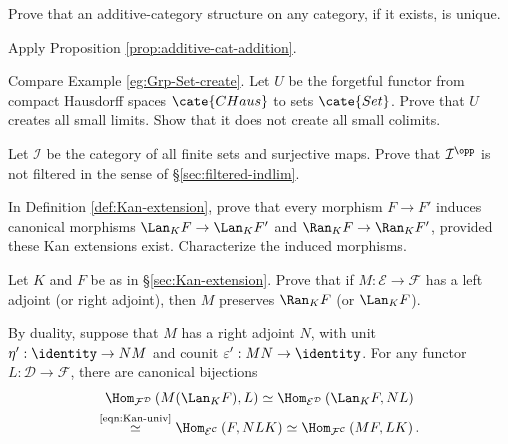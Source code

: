 \begin{Exercises}
	\item Prove that an additive-category structure on any category, if it
	exists, is unique.
	\begin{hint}
		Apply Proposition \ref{prop:additive-cat-addition}.
	\end{hint}

	\item Compare Example \ref{eg:Grp-Set-create}. Let $U$ be the forgetful
	functor from compact Hausdorff spaces $\cate{CHaus}$ to sets $\cate{Set}$.
	Prove that $U$ creates all small limits. Show that it does not create all
	small colimits.

	\item Let $\mathcal{I}$ be the category of all finite sets and surjective
	maps. Prove that $\mathcal{I}^{\opp}$ is not filtered in the sense of
	\S\ref{sec:filtered-indlim}.

	\item In Definition \ref{def:Kan-extension}, prove that every morphism
	$F\to F'$ induces canonical morphisms $\Lan_KF\to\Lan_KF'$ and
	$\Ran_KF\to\Ran_KF'$, provided these Kan extensions exist. Characterize
	the induced morphisms.

	\item Let $K$ and $F$ be as in \S\ref{sec:Kan-extension}. Prove that if
	$M:\mathcal{E}\to\mathcal{F}$ has a left adjoint (or right adjoint), then
	$M$ preserves $\Ran_KF$ (or $\Lan_KF$).

	\begin{hint}
		By duality, suppose that $M$ has a right adjoint $N$, with unit
		$\eta':\identity\to NM$ and counit $\varepsilon':MN\to\identity$. For
		any functor $L:\mathcal{D}\to\mathcal{F}$, there are canonical
		bijections
		\begin{multline*}
			\Hom_{\mathcal{F}^{\mathcal{D}}} \left( M (\Lan_K F) , L \right) \simeq \Hom_{\mathcal{E}^{\mathcal{D}}} \left( \Lan_K F, N L \right) \\
			\stackrel{\text{\eqref{eqn:Kan-univ}}}{\simeq} \Hom_{\mathcal{E}^{\mathcal{C}}} \left( F, NLK \right) \simeq \Hom_{\mathcal{F}^{\mathcal{C}}} \left( MF, LK \right).
		\end{multline*}


\end{hint}
\end{Exercises}
